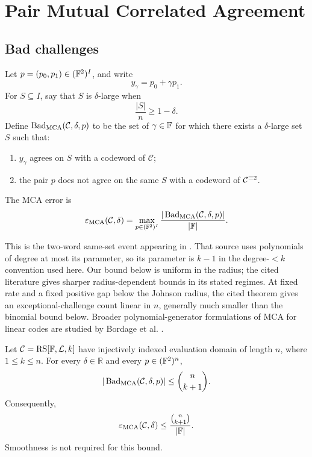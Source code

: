 \section{Pair Mutual Correlated Agreement}

\subsection{Bad challenges}

Let \(p=(p_0,p_1)\in(\mathbb{F}^2)^I\), and write
\[
  y_\gamma=p_0+\gamma p_1.
\]
For \(S\subseteq I\), say that \(S\) is \(\delta\)-large when
\[
  \frac{|S|}{n}\ge1-\delta.
\]
Define \(\operatorname{Bad}_{\operatorname{MCA}}(\mathcal C,\delta,p)\) to be the set of
\(\gamma\in\mathbb{F}\) for which there exists a \(\delta\)-large set \(S\) such that:
\begin{enumerate}[label=(\roman*)]
  \item \(y_\gamma\) agrees on \(S\) with a codeword of \(\mathcal C\);
  \item the pair \(p\) does not agree on the same \(S\) with a codeword of
    \(\mathcal C^{\equiv 2}\).
\end{enumerate}
The MCA error is
\[
  \varepsilon_{\operatorname{MCA}}(\mathcal C,\delta)
  =
  \max_{p\in(\mathbb{F}^2)^I}
  \frac{|\operatorname{Bad}_{\operatorname{MCA}}(\mathcal C,\delta,p)|}{|\mathbb{F}|}.
\]

This is the two-word same-set event appearing in
\cite[Theorem~4.6, full version]{benSassonCarmonHabockKoppartySaraf2026}.
That source uses polynomials of degree at most its parameter, so its
parameter is \(k-1\) in the degree-\(<k\) convention used here.
Our bound below is uniform in the radius; the cited literature gives
sharper radius-dependent bounds in its stated regimes. At fixed rate and a
fixed positive gap below the Johnson radius, the cited theorem gives an
exceptional-challenge count linear in \(n\), generally much smaller than
the binomial bound below. Broader polynomial-generator formulations of MCA
for linear codes are studied by Bordage et al.
\cite{bordageEtAl2026polynomialMCA}.

\begin{theorem}
\label{thm:pair-mca}
Let \(\mathcal C=\operatorname{RS}[\mathbb{F},\mathcal L,k]\) have injectively indexed
evaluation domain of length \(n\), where \(1\le k\le n\).  For every
\(\delta\in\mathbb R\) and every \(p\in(\mathbb{F}^2)^n\),
\[
  |\operatorname{Bad}_{\operatorname{MCA}}(\mathcal C,\delta,p)|
  \le \binom n{k+1}.
\]
Consequently,
\[
  \varepsilon_{\operatorname{MCA}}(\mathcal C,\delta)
  \le \frac{\binom n{k+1}}{|\mathbb{F}|}.
\]
Smoothness is not required for this bound.
\end{theorem}


